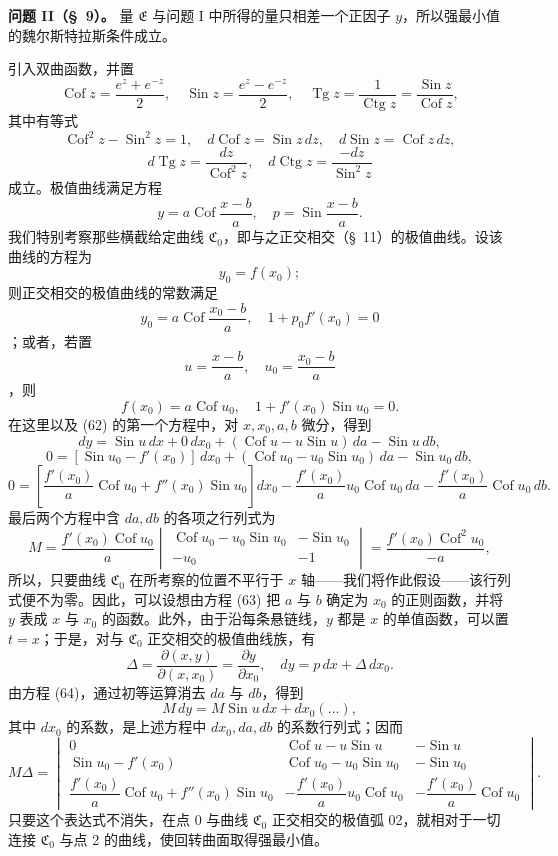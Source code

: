 \documentclass[11pt,a4paper,leqno]{article}
\newcommand{\Cof}{\operatorname{Cof}}
\newcommand{\Sin}{\operatorname{Sin}}
\newcommand{\Tg}{\operatorname{Tg}}
\newcommand{\Ctg}{\operatorname{Ctg}}
\begin{document}
\noindent\textbf{问题 II（\S~9）。} 量 $\mathfrak{E}$ 与问题 I 中所得的量只相差一个正因子 $y$，所以强最小值的魏尔斯特拉斯条件成立。

引入双曲函数，并置
\[
\Cof z=\frac{e^z+e^{-z}}{2},\quad
\Sin z=\frac{e^z-e^{-z}}{2},\quad
\Tg z=\frac{1}{\Ctg z}=\frac{\Sin z}{\Cof z},
\]
其中有等式
\[
\Cof^2z-\Sin^2z=1,\quad
d\Cof z=\Sin z\,dz,\quad
d\Sin z=\Cof z\,dz,
\]
\[
d\Tg z=\frac{dz}{\Cof^2z},\quad
d\Ctg z=\frac{-dz}{\Sin^2z}
\]
成立。极值曲线满足方程
\begin{equation}\tag{62}
y=a\Cof\frac{x-b}{a},\quad
p=\Sin\frac{x-b}{a}.
\end{equation}
我们特别考察那些横截给定曲线 $\mathfrak{C}_0$，即与之正交相交（\S~11）的极值曲线。设该曲线的方程为
\[
y_0=f(x_0);
\]
则正交相交的极值曲线的常数满足
\[
y_0=a\Cof\frac{x_0-b}{a},\quad
1+p_0f'(x_0)=0
\]
；或者，若置
\[
u=\frac{x-b}{a},\quad u_0=\frac{x_0-b}{a}
\]
，则
\begin{equation}\tag{63}
f(x_0)=a\Cof u_0,\quad
1+f'(x_0)\Sin u_0=0.
\end{equation}
在这里以及 (62) 的第一个方程中，对 $x,x_0,a,b$ 微分，得到
\[
dy=\Sin u\,dx+0\,dx_0+(\Cof u-u\Sin u)\,da-\Sin u\,db,
\]
\[
0=[\Sin u_0-f'(x_0)]\,dx_0+(\Cof u_0-u_0\Sin u_0)\,da-\Sin u_0\,db,
\]
\begin{equation}\tag{64}
0=
\left[\frac{f'(x_0)}{a}\Cof u_0+f''(x_0)\Sin u_0\right]dx_0
-\frac{f'(x_0)}{a}u_0\Cof u_0\,da
-\frac{f'(x_0)}{a}\Cof u_0\,db.
\end{equation}
最后两个方程中含 $da,db$ 的各项之行列式为
\[
M=
\frac{f'(x_0)\Cof u_0}{a}
\begin{vmatrix}
\Cof u_0-u_0\Sin u_0 & -\Sin u_0\\
-u_0 & -1
\end{vmatrix}
=
\frac{f'(x_0)\Cof^2u_0}{-a},
\]
所以，只要曲线 $\mathfrak{C}_0$ 在所考察的位置不平行于 $x$ 轴——我们将作此假设——该行列式便不为零。因此，可以设想由方程 (63) 把 $a$ 与 $b$ 确定为 $x_0$ 的正则函数，并将 $y$ 表成 $x$ 与 $x_0$ 的函数。此外，由于沿每条悬链线，$y$ 都是 $x$ 的单值函数，可以置 $t=x$；于是，对与 $\mathfrak{C}_0$ 正交相交的极值曲线族，有
\[
\Delta=\frac{\partial(x,y)}{\partial(x,x_0)}=\frac{\partial y}{\partial x_0},\quad
dy=p\,dx+\Delta\,dx_0.
\]
由方程 (64)，通过初等运算消去 $da$ 与 $db$，得到
\[
M\,dy=M\Sin u\,dx+dx_0(\ldots),
\]
其中 $dx_0$ 的系数，是上述方程中 $dx_0,da,db$ 的系数行列式；因而
\[
M\Delta=
\begin{vmatrix}
0 & \Cof u-u\Sin u & -\Sin u\\
\Sin u_0-f'(x_0) & \Cof u_0-u_0\Sin u_0 & -\Sin u_0\\
\dfrac{f'(x_0)}{a}\Cof u_0+f''(x_0)\Sin u_0 &
-\dfrac{f'(x_0)}{a}u_0\Cof u_0 &
-\dfrac{f'(x_0)}{a}\Cof u_0
\end{vmatrix}.
\]
只要这个表达式不消失，在点 0 与曲线 $\mathfrak{C}_0$ 正交相交的极值弧 02，就相对于一切连接 $\mathfrak{C}_0$ 与点 2 的曲线，使回转曲面取得强最小值。
\end{document}
